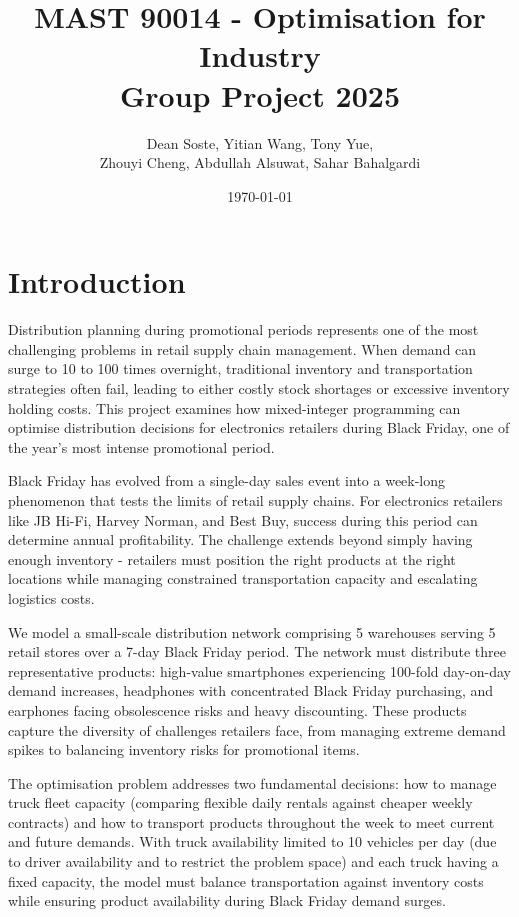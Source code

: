 \documentclass[a4paper,12pt]{article}
\title{MAST 90014 - Optimisation for Industry \\ Group Project 2025}
\author{{Dean Soste}, {Yitian Wang}, {Tony Yue}, \\
{Zhouyi Cheng}, {Abdullah Alsuwat}, {Sahar Bahalgardi}
}
\date{\today}
\begin{document}
\maketitle




\section{Introduction}\label{sec:introduction}

Distribution planning during promotional periods represents one of the most challenging problems in retail supply chain management.
When demand can surge to 10 to 100 times overnight, traditional inventory and transportation strategies often fail, leading to either costly stock shortages or excessive inventory holding costs.
This project examines how mixed-integer programming can optimise distribution decisions for electronics retailers during Black Friday, one of the year's most intense promotional period.

Black Friday has evolved from a single-day sales event into a week-long phenomenon that tests the limits of retail supply chains.
For electronics retailers like JB Hi-Fi, Harvey Norman, and Best Buy, success during this period can determine annual profitability.
The challenge extends beyond simply having enough inventory - retailers must position the right products at the right locations while managing constrained transportation capacity and escalating logistics costs.

We model a small-scale distribution network comprising 5 warehouses serving 5 retail stores over a 7-day Black Friday period.
The network must distribute three representative products: high-value smartphones experiencing 100-fold day-on-day demand increases, headphones with concentrated Black Friday purchasing, and earphones facing obsolescence risks and heavy discounting.
These products capture the diversity of challenges retailers face, from managing extreme demand spikes to balancing inventory risks for promotional items.

The optimisation problem addresses two fundamental decisions: how to manage truck fleet capacity (comparing flexible daily rentals against cheaper weekly contracts) and how to transport products throughout the week to meet current and future demands.
With truck availability limited to 10 vehicles per day (due to driver availability and to restrict the problem space) and each truck having a fixed capacity, the model must balance transportation against inventory costs while ensuring product availability during Black Friday demand surges.
\end{document}
